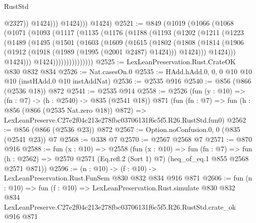 \begin{lexlean}{RustStd}
\begin{coremodule}
                      @2327))
                  @1424)))
            @1424)))
      @1424)
@2521 := @849
    (@1019
      (@1066
        (@1068
          (@1071
            (@1093
              (@1117
                (@1135
                  (@1176
                    (@1188
                      (@1193
                        (@1202
                          (@1211
                            (@1223
                              (@1489
                                (@1495
                                  (@1501
                                    (@1603
                                      (@1609
                                        (@1615
                                          (@1802
                                            (@1808
                                              (@1814
                                                (@1906
                                                  (@1912
                                                    (@1918 (@1989 (@1995 (@2001 @2487) @1424)))
                                                    @1424)))
                                              @1424)))
                                        @1424)))
                                  @1424)))))))))))))))
@2525 := LexLeanPreservation.Rust.CrateOK @830 @832 @834
@2526 := Nat.casesOn.{0}
@2535 := HAdd.hAdd.{0, 0, 0} @10 @10 @10 (instHAdd.{0} @10 instAddNat)
@2536 := @2535 @916
@2540 := @856 (@866 (@2536 @18)) @872
@2541 := @2535 @914
@2558 := @2526
    (fun (y : @10) => (fn : @7) -> (h : @2540) -> @835 (@2541 @18))
    @871
    (fun (fn : @7) =>
    fun (h : @856 (@866 (@2535 Nat.zero @18)) @872) =>
    LexLeanPreserve.C27e2f04c213e278fbc03706131f6c5f5.R26.RustStd.fun0)
@2562 := @856 (@866 (@2536 @23)) @872
@2567 := Option.noConfusion.{0, 0} (@835 (@2541 @23)) @7
@2568 := @338 @7
@2570 := @2567 @2568 @7
@2571 := @870 @916
@2588 := fun (x : @10) =>
  @2558
    (fun (x : @10) =>
    fun (fn : @7) =>
    fun (h : @2562) => @2570 @2571 (Eq.refl.{2} (Sort 1) @7) (heq_of_eq.{1} @855 @2568 @2571 @871))
@2596 := (n : @10) -> (f : @10) -> LexLeanPreservation.Rust.FunSem @830 @832 @834 @916 @871
@2606 := fun (n : @10) =>
  fun (f : @10) =>
  LexLeanPreservation.Rust.simulate
    @830
    @832
    @834
    LexLeanPreserve.C27e2f04c213e278fbc03706131f6c5f5.R26.RustStd.crate_ok
    @916
    @871
\end{coremodule}
\end{lexlean}
